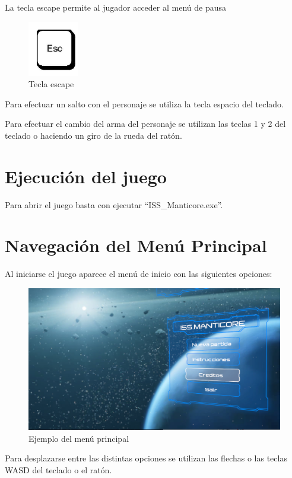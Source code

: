 La tecla escape permite al jugador acceder al menú de pausa
\begin{figure}[H]
	\centering
	\includegraphics[scale=0.50]{imagenes/escape.png}
	\caption{\label{fig:escape}Tecla escape}
\end{figure}

Para efectuar un salto con el personaje se utiliza la tecla espacio del teclado.

Para efectuar el cambio del arma del personaje se utilizan las teclas 1 y 2 del teclado o haciendo un giro de la rueda del ratón.

\section{Ejecución del juego}
Para abrir el juego basta con ejecutar ``ISS\_Manticore.exe''.

\section{Navegación del Menú Principal}
Al iniciarse el juego aparece el menú de inicio con las siguientes opciones: 

\begin{figure}[H]
	\centering
	\includegraphics[scale=0.40]{imagenes/MenuPrincipal3D1.png}
	\caption{\label{fig:EjemploMenuPrincipal3D}Ejemplo del menú principal}
\end{figure}

Para desplazarse entre las distintas opciones se utilizan las flechas o las teclas WASD del teclado o el ratón.

